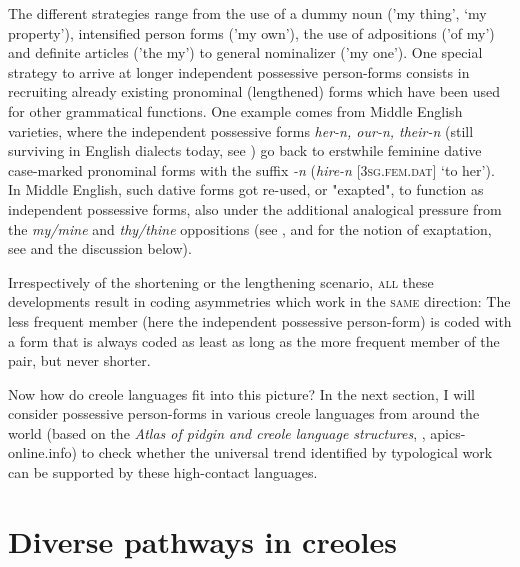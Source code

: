 \documentclass[output=paper]{langsci/langscibook}
\begin{document}
The different strategies range from the use of a dummy noun ('my thing', `my property'), intensified person forms ('my own'), the use of adpositions ('of my') and definite articles ('the my') to general nominalizer ('my one'). One special strategy to arrive at longer independent possessive person-forms consists in recruiting already existing pronominal (lengthened) forms which have been used for other grammatical functions. One example comes from Middle English varieties, where the independent possessive forms \textit{her-n, our-n, their-n} (still surviving in English dialects today, see \citealt{KortmannLunkenheimer2013}) go back to erstwhile feminine dative case-marked pronominal forms with the suffix \textit{{}-n} (\textit{hire-n} [\textsc{3sg.fem.dat}] `to her'). In Middle English, such dative forms got re-used, or "exapted", to function as independent possessive forms, also under the additional analogical pressure from the \textit{my/mine} and \textit{thy/thine} oppositions (see \citealt{Allen2002}, and for the notion of exaptation, see \citealt{Lass1990,Lass2017,NordeVandeVelde2016} and the discussion below). 

Irrespectively of the shortening or the lengthening scenario, \textsc{all} these developments result in coding asymmetries which work in the \textsc{same} direction: The less frequent member (here the independent possessive person-form) is coded with a form that is always coded as least as long as the more frequent member of the pair, but never shorter.

Now how do creole languages fit into this picture? In the next section, I will consider possessive person-forms in various creole languages from around the world (based on the \textit{Atlas of pidgin and creole language structures}, \citealt{MichaelisEtAl2013}, apics-online.info) to check whether the universal trend identified by typological work can be supported by these high-contact languages.

\section{Diverse pathways in creoles}
\end{document}
